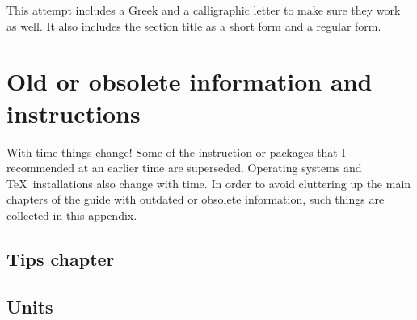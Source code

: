 
This attempt includes a Greek and a calligraphic letter to make sure they work as well.
It also includes the section title as a short form and a regular form.

\chapter{Old or obsolete information and instructions}%
\label{sec:app:old}

With time things change! Some of the instruction or packages that I
recommended at an earlier time are superseded. Operating systems and
\TeX\ installations also change with time. In order to avoid
cluttering up the main chapters of the guide with outdated or obsolete
information, such things are collected in this appendix.

\section*{Tips chapter}%
\label{sec:app:tips}

\section{Units}%
\label{sec:app:tips:units}

